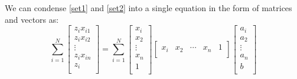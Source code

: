 \documentclass[11pt, fleqn]{article}
\begin{document}
We can condense \eqref{set1} and \eqref{set2} into a single equation in the form of matrices and vectors as:
\begin{equation}
    \sum_{i=1}^{N}
    \begin{bmatrix}
        z_i x_{i1} \\
        z_i x_{i2} \\
        \vdots \\
        z_i x_{in} \\
        z_i \\
    \end{bmatrix}
    =
    \sum_{i=1}^{N}
    \begin{bmatrix}
        x_i \\
        x_2 \\
        \vdots \\
        x_n \\
        1 \\
    \end{bmatrix}
    \begin{bmatrix}
        x_i & x_2 & \cdots & x_n & 1 \\
    \end{bmatrix}
    \begin{bmatrix}
        a_i \\
        a_2 \\
        \vdots \\
        a_n \\
        b \\
    \end{bmatrix}
\end{equation}
\end{document}
